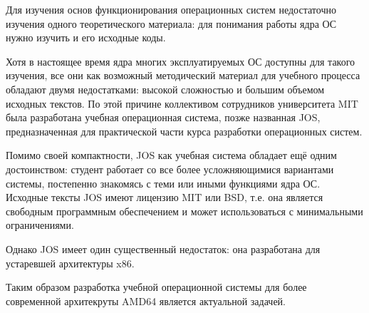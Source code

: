 \Introduction

Для изучения основ функционирования операционных систем недостаточно
изучения одного теоретического материала: для понимания работы ядра
ОС нужно изучить и его исходные коды.

Хотя в настоящее время ядра многих эксплуатируемых ОС доступны для
такого изучения, все они как возможный методический материал для
учебного процесса обладают двумя недостатками: высокой сложностью
и большим объемом исходных текстов. По этой причине коллективом
сотрудников университета MIT была разработана учебная операционная
система, позже названная JOS, предназначенная для практической
части курса разработки операционных систем.

Помимо своей компактности, JOS как учебная система обладает ещё одним
достоинством: студент работает со все более усложняющимися вариантами
системы, постепенно знакомясь с теми или иными функциями ядра ОС.
Исходные тексты JOS имеют лицензию MIT или BSD, т.е. она является
свободным программным обеспечением и может использоваться с минимальными
ограничениями.

Однако JOS имеет один существенный недостаток: она разработана для
устаревшей архитектуры x86.

Таким образом разработка учебной операционной системы для более современной
архитекруты AMD64 является актуальной задачей.
